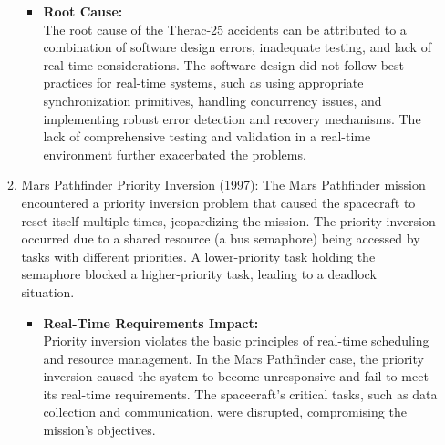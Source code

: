\documentclass[a4paper,11pt]{article}%
\newenvironment{qanda}{\setlength{\parindent}{0pt}}{\bigskip}
\begin{document}
\begin{qanda}
\begin{enumerate}
\begin{enumerate}
\begin{itemize}
					      \item \textbf{Root Cause:}\\
					            The root cause of the Therac-25 accidents can be attributed to a combination of software design errors, inadequate testing, and lack of real-time considerations. The software design did not follow best practices for real-time systems, such as using appropriate synchronization primitives, handling concurrency issues, and implementing robust error detection and recovery mechanisms. The lack of comprehensive testing and validation in a real-time environment further exacerbated the problems.
				      \end{itemize}
				\item Mars Pathfinder Priority Inversion (1997): The Mars Pathfinder mission encountered a priority inversion problem that caused the spacecraft to reset itself multiple times, jeopardizing the mission. The priority inversion occurred due to a shared resource (a bus semaphore) being accessed by tasks with different priorities. A lower-priority task holding the semaphore blocked a higher-priority task, leading to a deadlock situation.\
				      \begin{itemize}
					      \item \textbf{Real-Time Requirements Impact:}\\
					            Priority inversion violates the basic principles of real-time scheduling and resource management. In the Mars Pathfinder case, the priority inversion caused the system to become unresponsive and fail to meet its real-time requirements. The spacecraft's critical tasks, such as data collection and communication, were disrupted, compromising the mission's objectives.


\end{itemize}
\end{enumerate}
\end{enumerate}
\end{qanda}
\end{document}

